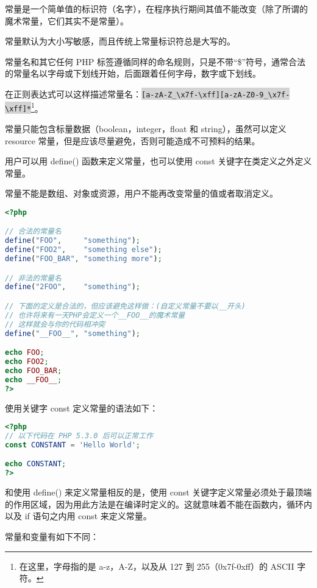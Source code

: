 常量是一个简单值的标识符（名字），在程序执行期间其值不能改变（除了所谓的魔术常量，它们其实不是常量）。

常量默认为大小写敏感，而且传统上常量标识符总是大写的。



常量名和其它任何 PHP 标签遵循同样的命名规则，只是不带“\$”符号，通常合法的常量名以字母或下划线开始，后面跟着任何字母，数字或下划线。

在正则表达式可以这样描述常量名：\colorbox{lightgray}{\texttt{[a-zA-Z\_\textbackslash x7f-\textbackslash xff][a-zA-Z0-9\_\textbackslash x7f-\textbackslash xff]*}}\footnote{在这里，字母指的是 a-z，A-Z，以及从 127 到 255（0x7f-0xff）的 ASCII 字符。}。

常量只能包含标量数据（boolean，integer，float 和 string），虽然可以定义 resource 常量，但是应该尽量避免，否则可能造成不可预料的结果。



用户可以用 define() 函数来定义常量，也可以使用 const 关键字在类定义之外定义常量。

常量不能是数组、对象或资源，用户不能再改变常量的值或者取消定义。

\begin{lstlisting}[language=PHP]
<?php

// 合法的常量名
define("FOO",     "something");
define("FOO2",    "something else");
define("FOO_BAR", "something more");

// 非法的常量名
define("2FOO",    "something");

// 下面的定义是合法的，但应该避免这样做：(自定义常量不要以__开头)
// 也许将来有一天PHP会定义一个__FOO__的魔术常量
// 这样就会与你的代码相冲突
define("__FOO__", "something");

echo FOO;
echo FOO2;
echo FOO_BAR;
echo __FOO__;
?>
\end{lstlisting}


使用关键字 const 定义常量的语法如下：

\begin{lstlisting}[language=PHP]
<?php
// 以下代码在 PHP 5.3.0 后可以正常工作
const CONSTANT = 'Hello World';

echo CONSTANT;
?>
\end{lstlisting}



和使用 define() 来定义常量相反的是，使用 const 关键字定义常量必须处于最顶端的作用区域，因为用此方法是在编译时定义的。这就意味着不能在函数内，循环内以及 if 语句之内用 const 来定义常量。

常量和变量有如下不同：

